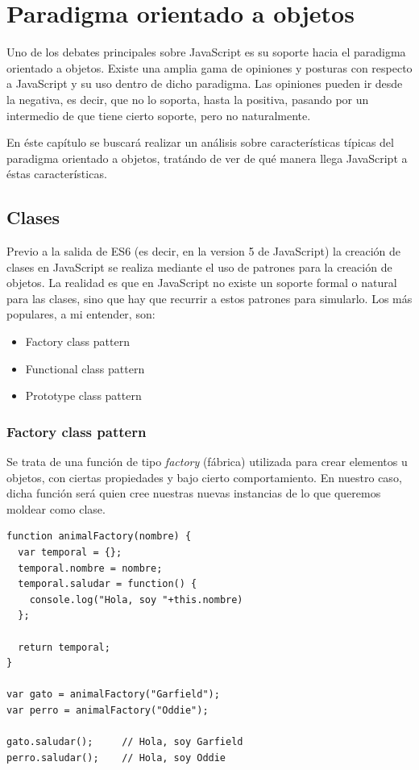 \chapter{Paradigma orientado a objetos}

\label{Chapter4}


Uno de los debates principales sobre JavaScript es su soporte hacia el paradigma orientado a objetos. Existe una amplia gama de opiniones y posturas con respecto a JavaScript y su uso dentro de dicho paradigma. Las opiniones pueden ir desde la negativa, es decir, que no lo soporta, hasta la positiva, pasando por un intermedio de que tiene cierto soporte, pero no naturalmente.

En éste capítulo se buscará realizar un análisis sobre características típicas del paradigma orientado a objetos, tratándo de ver de qué manera llega JavaScript a éstas características.


\section{Clases}
\label{clases}

Previo a la salida de ES6 (es decir, en la version 5 de JavaScript) la creación de clases en JavaScript se realiza mediante el uso de patrones para la creación de objetos. La realidad es que en JavaScript no existe un soporte formal o natural para las clases, sino que hay que recurrir a estos patrones para simularlo. Los más populares, a mi entender, son:

\begin{itemize}
	\item Factory class pattern
	\item Functional class pattern
	\item Prototype class pattern
\end{itemize}

\subsection{Factory class pattern}

Se trata de una función de tipo \textit{factory} (fábrica) utilizada para crear elementos u objetos, con ciertas propiedades y bajo cierto comportamiento. En nuestro caso, dicha función será quien cree nuestras nuevas instancias de lo que queremos moldear como clase.

\begin{lstlisting}[title={Factory class pattern}]
function animalFactory(nombre) {
  var temporal = {};
  temporal.nombre = nombre;
  temporal.saludar = function() {
    console.log("Hola, soy "+this.nombre)
  };

  return temporal;
}

var gato = animalFactory("Garfield");
var perro = animalFactory("Oddie");

gato.saludar();		// Hola, soy Garfield
perro.saludar();	// Hola, soy Oddie
\end{lstlisting}

